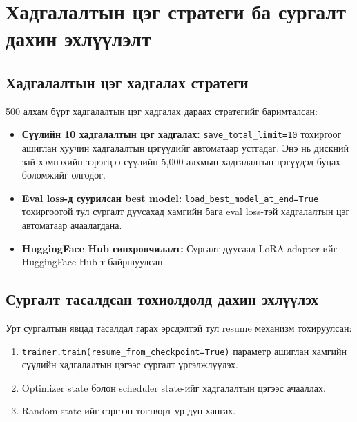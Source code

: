 \section{Хадгалалтын цэг стратеги ба сургалт дахин эхлүүлэлт}

\subsection{Хадгалалтын цэг хадгалах стратеги}

500 алхам бүрт хадгалалтын цэг хадгалах дараах стратегийг баримталсан:

\begin{itemize}
    \item \textbf{Сүүлийн 10 хадгалалтын цэг хадгалах:} \texttt{save\_total\_limit=10} тохиргоог ашиглан хуучин хадгалалтын цэгүүдийг автоматаар устгадаг. Энэ нь дискний зай хэмнэхийн зэрэгцээ сүүлийн 5,000 алхмын хадгалалтын цэгүүдэд буцах боломжийг олгодог.
    \item \textbf{Eval loss-д суурилсан best model:} \texttt{load\_best\_model\_at\_end=True} тохиргоотой тул сургалт дуусахад хамгийн бага eval loss-тэй хадгалалтын цэг автоматаар ачаалагдана.
    \item \textbf{HuggingFace Hub синхрончилалт:} Сургалт дуусаад LoRA adapter-ийг HuggingFace Hub-т байршуулсан.
\end{itemize}

\subsection{Сургалт тасалдсан тохиолдолд дахин эхлүүлэх}

Урт сургалтын явцад тасалдал гарах эрсдэлтэй тул resume механизм тохируулсан:

\begin{enumerate}
    \item \texttt{trainer.train(resume\_from\_checkpoint=True)} параметр ашиглан хамгийн сүүлийн хадгалалтын цэгээс сургалт үргэлжлүүлэх.
    \item Optimizer state болон scheduler state-ийг хадгалалтын цэгээс ачааллах.
    \item Random state-ийг сэргээн тогтворт үр дүн хангах.
\end{enumerate}

